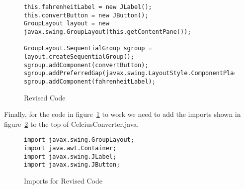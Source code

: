 \documentclass[]{tufte-handout}
\begin{document}
\begin{figure}[ht]
\begin{lstlisting}
this.fahrenheitLabel = new JLabel();
this.convertButton = new JButton();
GroupLayout layout = new javax.swing.GroupLayout(this.getContentPane());

GroupLayout.SequentialGroup sgroup = layout.createSequentialGroup();
sgroup.addComponent(convertButton);
sgroup.addPreferredGap(javax.swing.LayoutStyle.ComponentPlacement.RELATED);
sgroup.addComponent(fahrenheitLabel);
\end{lstlisting}
\label{revise}
\caption{Revised Code}
\end{figure}


Finally, for the code in figure~\ref{revise} to work we need to add the imports shown in figure~\ref{ports} to the top of CelciusConverter.java.
\begin{figure}[ht]
\begin{lstlisting}
import javax.swing.GroupLayout;
import java.awt.Container;
import javax.swing.JLabel;
import javax.swing.JButton;
\end{lstlisting}
\label{ports}
\caption{Imports for Revised Code}
\end{figure}
\end{document}
